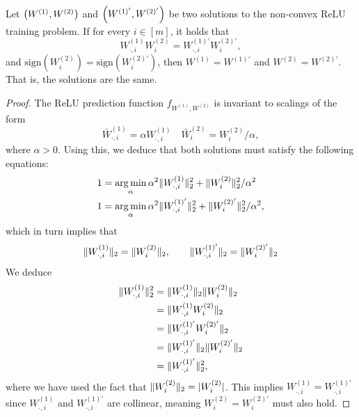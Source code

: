 
\begin{lemma}\label{lemma:scaling-unique}
    Let \( \left(W^{(1)}, W^{(2)}\right) \) and \( \left(W^{(1)'}, W^{(2)'}\right) \)
    be two solutions to the non-convex ReLU training problem.
    If for every \( i \in [m]  \),
    it holds that
    \[
        W^{(1)}_{\cdot, i} W^{(2)}_{i} = W^{(1)'}_{\cdot, i} W^{(2)'}_{i},
    \]
    and \( \text{sign}(W^{(2)}_{i}) = \text{sign}(W^{(2)'}_{i}) \),
    then \( W^{(1)} = W^{(1)'} \) and \( W^{(2)} = W^{(2)'} \).
    That is, the solutions are the same.
\end{lemma}
\begin{proof}
    The ReLU prediction function \( f_{W^{(1)}, W^{(2)}} \) is invariant to
    scalings of the form
    \[
        \bar W^{(1)}_{\cdot, i} = \alpha W^{(1)}_{\cdot, i} \quad \bar W^{(2)}_{i} = W^{(2)}_{i} / \alpha,
    \]
    where \( \alpha > 0 \).
    Using this, we deduce that both solutions must satisfy the following
    equations:
    \begin{align*}
        1 & = \mathop{\rm arg\,min}_{\alpha} \alpha^2 \|W^{(1)}_{\cdot, i}\|_2^2 + \|W^{(2)}_{i}\|_2^2 / \alpha^2    \\
        1 & = \mathop{\rm arg\,min}_{\alpha} \alpha^2 \|W^{(1)'}_{\cdot, i}\|_2^2 + \|W^{(2)'}_{i}\|_2^2 / \alpha^2,
    \end{align*}
    which in turn implies that
    \[
        \|W^{(1)}_{\cdot, i}\|_2 = \|W^{(2)}_{i}\|_2, \quad \quad \|W^{(1)'}_{\cdot, i}\|_2 = \|W^{(2)'}_{i}\|_2
    \]
    We deduce
    \begin{align*}
        \|W^{(1)}_{\cdot, i}\|^2_2
         & = \|W^{(1)}_{\cdot, i}\|_2 \|W^{(2)}_{i}\|_2    \\
         & = \|W^{(1)}_{\cdot, i} W^{(2)}_{i}\|_2             \\
         & = \|W^{(1)'}_{\cdot, i} W^{(2)'}_{i}\|_2           \\
         & = \|W^{(1)'}_{\cdot, i} \|_2 \|W^{(2)'}_{i}\|_2 \\
         & = \|W^{(1)'}_{\cdot, i}\|^2_2,
    \end{align*}
    where we have used the fact that \( \|W^{(2)}_{i}\|_2 = |W^{(2)}_{i}| \).
    This implies \( W^{(1)}_{\cdot, i} = W^{(1)'}_{\cdot, i} \) since \( W^{(1)}_{\cdot, i} \) and \( W^{(1)'}_{\cdot, i} \)
    are collinear, meaning \( W^{(2)}_{i} = W^{(2)'}_{i} \) must also hold.
\end{proof}

